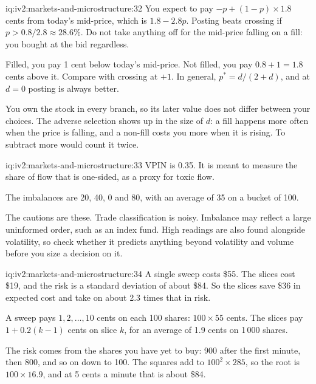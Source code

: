 \begin{solution}{iq:iv2:markets-and-microstructure:32}
You expect to pay $-p + (1 - p) \times 1.8$ cents from today's mid-price, which is $1.8 - 2.8p$. Posting beats crossing if $p > 0.8/2.8 \approx 28.6\%$. Do not take anything off for the mid-price falling on a fill: you bought at the bid regardless.

Filled, you pay 1 cent below today's mid-price. Not filled, you pay $0.8 + 1 = 1.8$ cents above it. Compare with crossing at $+1$. In general, $p^* = d/(2 + d)$, and at $d = 0$ posting is always better.

You own the stock in every branch, so its later value does not differ between your choices. The adverse selection shows up in the size of $d$: a fill happens more often when the price is falling, and a non-fill costs you more when it is rising. To subtract more would count it twice.

\end{solution}

\begin{solution}{iq:iv2:markets-and-microstructure:33}
VPIN is 0.35. It is meant to measure the share of flow that is one-sided, as a proxy for toxic flow.

The imbalances are 20, 40, 0 and 80, with an average of 35 on a bucket of 100.

The cautions are these. Trade classification is noisy. Imbalance may reflect a large uninformed order, such as an index fund. High readings are also found alongside volatility, so check whether it predicts anything beyond volatility and volume before you size a decision on it.

\end{solution}

\begin{solution}{iq:iv2:markets-and-microstructure:34}
A single sweep costs \$55. The slices cost \$19, and the risk is a standard deviation of about \$84. So the slices save \$36 in expected cost and take on about 2.3 times that in risk.

A sweep pays $1, 2, \ldots, 10$ cents on each 100 shares: $100 \times 55$ cents. The slices pay $1 + 0.2(k - 1)$ cents on slice $k$, for an average of 1.9 cents on 1\,000 shares.

The risk comes from the shares you have yet to buy: 900 after the first minute, then 800, and so on down to 100. The squares add to $100^2 \times 285$, so the root is $100 \times 16.9$, and at 5 cents a minute that is about \$84.

\end{solution}

